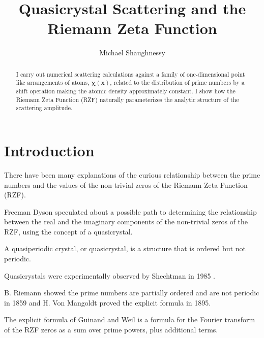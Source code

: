 \documentclass[11pt, oneside]{article}   	%
\title{Quasicrystal Scattering and the Riemann Zeta Function}
\author{Michael Shaughnessy}
\begin{document}
\maketitle

\begin{abstract}
I carry out numerical scattering calculations against a family of one-dimensional point like arrangements of atoms, $\mathbf{\chi(x)}$, related to the distribution of prime numbers by a shift operation making the atomic density approximately constant. 
I show how the Riemann Zeta Function (RZF) naturally parameterizes the analytic structure of the scattering amplitude. 
\end{abstract}

\section{Introduction}

There have been many explanations of the curious relationship between the prime numbers and the values of the non-trivial zeros of the Riemann Zeta Function (RZF).

\cite{Riemann, Selberg, Dyson, Zhang}

Freeman Dyson \cite{Baez} speculated about a possible path to determining the relationship between the real and the imaginary components of the non-trivial zeros of the RZF, using the concept of a quasicrystal.

A quasiperiodic crystal, or quasicrystal, is a structure that is ordered but not periodic.

Quasicrystals were experimentally observed by Shechtman in 1985 \cite{Shechtman1985}. 

B. Riemann showed the prime numbers are partially ordered and are not periodic \cite{Riemann1859} in 1859 and H. Von Mangoldt \cite{VonMangoldt1895} proved the explicit formula in 1895.

The explicit formula of Guinand and Weil \cite{Weil} is a formula for the Fourier transform of the RZF zeros as a sum over prime powers, plus additional terms.  

\end{document}
